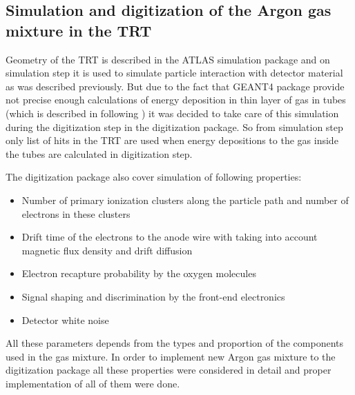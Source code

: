 \subsection{Simulation and digitization of the Argon gas mixture in the TRT}
\label{subsec:TRT:argonImpl}


Geometry of the TRT is described in the ATLAS simulation package and on simulation step it is used to simulate particle interaction with detector material as was described previously.
But due to the fact that GEANT4 package provide not precise enough calculations of energy deposition in thin layer of gas in tubes 
(which is described in following ) it was decided to take care of this simulation during the digitization step in the digitization package.
So from simulation step only list of hits in the TRT are used when energy depositions to the gas inside the tubes are calculated in digitization step.


The digitization package also cover simulation of following properties:
\begin{itemize}
 \item Number of primary ionization clusters along the particle path and number of electrons in these clusters
 \item Drift time of the electrons to the anode wire with taking into account magnetic flux density and drift diffusion
 \item Electron recapture probability by the oxygen molecules
 \item Signal shaping and discrimination by the front-end electronics
 \item Detector white noise
\end{itemize}


All these parameters depends from the types and proportion of the components used in the gas mixture. 
In order to implement new Argon gas mixture to the digitization package all these properties were considered in detail 
and proper implementation of all of them were done.

